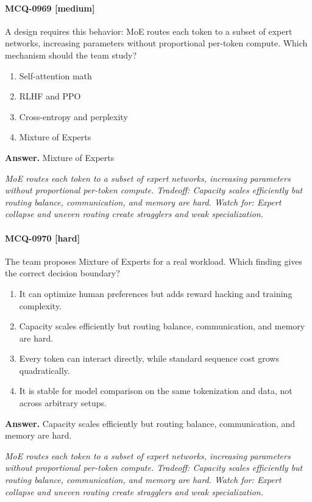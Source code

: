 \paragraph{MCQ-0969 [medium]} A design requires this behavior: MoE routes each token to a subset of expert networks, increasing parameters without proportional per-token compute. Which mechanism should the team study?
\begin{enumerate}[label=\Alph*.]
\item Self-attention math
\item RLHF and PPO
\item Cross-entropy and perplexity
\item Mixture of Experts
\end{enumerate}
\noindent\textbf{Answer.} Mixture of Experts
\par\textit{MoE routes each token to a subset of expert networks, increasing parameters without proportional per-token compute. Tradeoff: Capacity scales efficiently but routing balance, communication, and memory are hard. Watch for: Expert collapse and uneven routing create stragglers and weak specialization.}
\paragraph{MCQ-0970 [hard]} The team proposes Mixture of Experts for a real workload. Which finding gives the correct decision boundary?
\begin{enumerate}[label=\Alph*.]
\item It can optimize human preferences but adds reward hacking and training complexity.
\item Capacity scales efficiently but routing balance, communication, and memory are hard.
\item Every token can interact directly, while standard sequence cost grows quadratically.
\item It is stable for model comparison on the same tokenization and data, not across arbitrary setups.
\end{enumerate}
\noindent\textbf{Answer.} Capacity scales efficiently but routing balance, communication, and memory are hard.
\par\textit{MoE routes each token to a subset of expert networks, increasing parameters without proportional per-token compute. Tradeoff: Capacity scales efficiently but routing balance, communication, and memory are hard. Watch for: Expert collapse and uneven routing create stragglers and weak specialization.}
